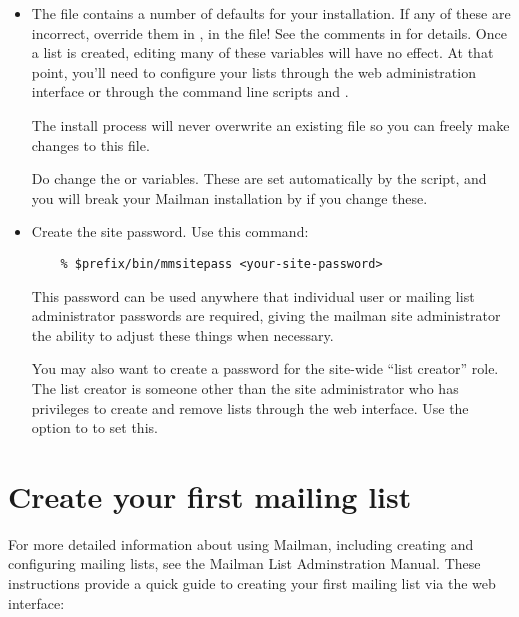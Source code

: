 \documentclass{howto}
\begin{document}
\begin{itemize}
\item The file  contains a number of
      defaults for your installation.  If any of these are incorrect, override
      them in ,  in the
       file!  See the comments in  for
      details.  Once a list is created, editing many of these variables will
      have no effect.  At that point, you'll need to configure your lists
      through the web administration interface or through the command line
      scripts  and .

      The install process will never overwrite an existing 
      file so you can freely make changes to this file.

      \begin{notice}[note]
      Do  change the  or 
      variables.  These are set automatically by the 
      script, and you will break your Mailman installation by if you change
      these.
      \end{notice}
\item Create the site password.  Use this command:

\begin{verbatim}
    % $prefix/bin/mmsitepass <your-site-password>
\end{verbatim}

    This password can be used anywhere that individual user or mailing list
    administrator passwords are required, giving the mailman site
    administrator the ability to adjust these things when necessary.

    You may also want to create a password for the site-wide ``list creator''
    role.  The list creator is someone other than the site administrator who
    has privileges to create and remove lists through the web interface.  Use
    the  option to  to set this.

\end{itemize}

\section{Create your first mailing list}

For more detailed information about using Mailman, including creating and
configuring mailing lists, see the Mailman List Adminstration Manual.  These
instructions provide a quick guide to creating your first mailing list via the
web interface:
\end{document}
